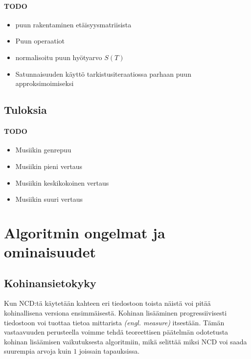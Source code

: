 \documentclass[12pt,finnish]{tktltiki2}
\theoremstyle{definition}
\theoremstyle{remark}
\newcommand{\engl}[1]{\emph{(engl. #1)}}
\begin{document}

  \paragraph{TODO} %
    \begin{itemize}
      \item puun rakentaminen etäisyysmatriisista
      \item Puun operaatiot
      \item normalisoitu puun hyötyarvo $S(T)$
      \item Satunnaisuuden käyttö tarkistusiteraatiossa parhaan puun approksimoimiseksi
    \end{itemize}
    \subsection{Tuloksia} %
    \label{sub:tuloksia}
      \paragraph{TODO} %
      \begin{itemize}
        \item Musiikin genrepuu
        \item Musiikin pieni vertaus
        \item Musiikin keskikokoinen vertaus
        \item Musiikin suuri vertaus
      \end{itemize}


\section{Algoritmin ongelmat ja ominaisuudet} %
\label{sec:algoritmin_ongelmat_ja_ominaisuudet}
  \subsection{Kohinansietokyky} %
  \label{sub:kohinansietokyky}

    Kun NCD:tä käytetään kahteen eri tiedostoon toista näistä voi pitää kohinallisena versiona ensimmäisestä.
    Kohinan lisääminen progressiivisesti tiedostoon voi tuottaa tietoa mittarista \engl{measure} itsestään.
    Tämän vastaavuuden perusteella voimme tehdä teoreettisen päätelmän odotetusta kohinan lisäämisen vaikutuksesta algoritmiin, mikä selittää miksi NCD voi saada suurempia arvoja kuin $1$ joissain tapauksissa. \cite{4167725}
\end{document}
